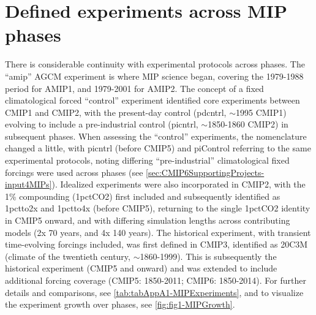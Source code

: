 \documentclass[manuscript]{copernicus}
\begin{document}
\section{Defined experiments across MIP phases}  %
\label{sec:secAppA1-MIPExperiments}
There is considerable continuity with experimental protocols across phases. The ``amip'' AGCM experiment is where MIP science began, covering the 1979-1988 period for AMIP1, and 1979-2001 for AMIP2. The concept of a fixed climatological forced ``control'' experiment identified core experiments between CMIP1 and CMIP2, with the present-day control (pdcntrl, $\sim$1995 CMIP1) evolving to include a pre-industrial control (picntrl, $\sim$1850-1860 CMIP2) in subsequent phases. When assessing the ``control'' experiments, the nomenclature changed a little, with picntrl (before CMIP5) and piControl referring to the same experimental protocols, noting differing ``pre-industrial'' climatological fixed forcings were used across phases (see \autoref{sec:CMIP6SupportingProjects-input4MIPs}). Idealized experiments were also incorporated in CMIP2, with the 1\% compounding (1pctCO2) first included and subsequently identified as 1pctto2x and 1pctto4x (before CMIP5), returning to the single 1pctCO2 identity in CMIP5 onward, and with differing simulation lengths across contributing models (2x 70 years, and 4x 140 years). The historical experiment, with transient time-evolving forcings included, was first defined in CMIP3, identified as 20C3M (climate of the twentieth century, $\sim$1860-1999). This is subsequently the historical experiment (CMIP5 and onward) and was extended to include additional forcing coverage (CMIP5: 1850-2011; CMIP6: 1850-2014). For further details and comparisons, see \autoref{tab:tabAppA1-MIPExperiments}, and to visualize the experiment growth over phases, see \autoref{fig:fig1-MIPGrowth}.
\end{document}
